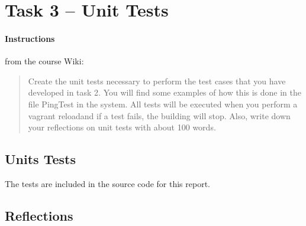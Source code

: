 %
%
%
%


\section{Task 3 -- Unit Tests}

\paragraph{Instructions}\label{task-3-instructions}
from the course Wiki\cite{1dv600:lab3:instructions}:

\begin{quote}
    Create the unit tests necessary to perform the test cases that you have
    developed in task 2. You will find some examples of how this is done in the
    file PingTest in the system. All tests will be executed when you perform a
    vagrant reloadand if a test fails, the building will stop. Also, write down
    your reflections on unit tests with about 100 words.
\end{quote}



\subsection{Units Tests}\label{task-3}
The tests are included in the source code for this report.


\subsection{Reflections}\label{task-3-reflect}
